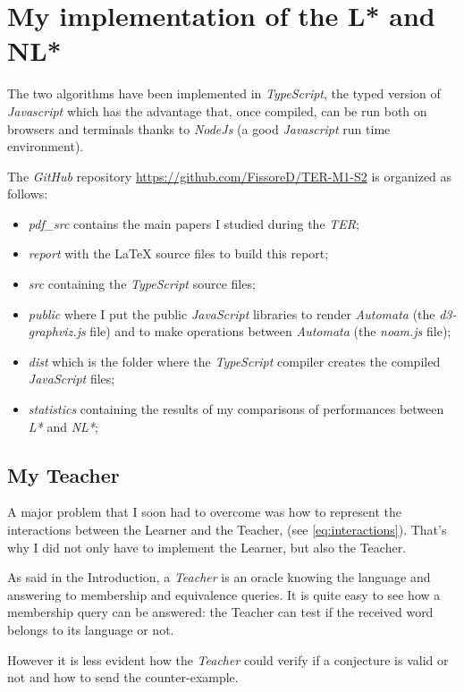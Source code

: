 \section{My implementation of the L* and NL*}

The two algorithms have been implemented in \textit{TypeScript}, the typed version of \textit{Javascript} which has the advantage that, once compiled, can be run both on browsers and terminals thanks to \textit{NodeJs} (a good \textit{Javascript} run time environment).

The \textit{GitHub} repository \url{https://github.com/FissoreD/TER-M1-S2} is organized as follows:
\begin{itemize}
  \item \textit{pdf\_src} contains the main papers I studied during the \textit{TER};
  \item \textit{report} with the \LaTeX{} source files to build this report;
  \item \textit{src} containing the \textit{TypeScript} source files;
  \item \textit{public} where I put the public \textit{JavaScript} libraries to render \textit{Automata} (the \textit{d3-graphviz.js} file) and to make operations between \textit{Automata} (the \textit{noam.js} file);
  \item \textit{dist} which is the folder where the \textit{TypeScript} compiler creates the compiled \textit{JavaScript} files;
  \item \textit{statistics} containing the results of my comparisons of performances between \textit{L*} and \textit{NL*};
\end{itemize}

\subsection{My Teacher}

A major problem that I soon had to overcome was how to represent the interactions between the Learner and the Teacher, (see \cref{eq:interactions}). That's why  I did not only have to implement the Learner, but also the Teacher.

As said in the Introduction, a \textit{Teacher} is an oracle knowing the language and answering to membership and equivalence queries. It is quite easy to see how a membership query can be answered: the Teacher can test if the received word belongs to its language or not.

However it is less evident how the \textit{Teacher} could verify if a conjecture is valid or not and how to send the counter-example.

